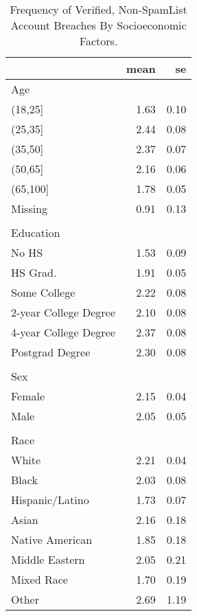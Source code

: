\begin{table}[!htb]
\centering
\caption{Frequency of Verified, Non-SpamList Account Breaches By Socioeconomic Factors.} 
\label{table:socdem_verified_dat}
\begingroup\small
\begin{tabular}{lrr}
  \hline
 & mean & se \\ 
  \hline
Age &  &  \\ 
  (18,25] & 1.63 & 0.10 \\ 
  (25,35] & 2.44 & 0.08 \\ 
  (35,50] & 2.37 & 0.07 \\ 
  (50,65] & 2.16 & 0.06 \\ 
  (65,100] & 1.78 & 0.05 \\ 
  Missing & 0.91 & 0.13 \\ 
   &  &  \\ 
  Education &  &  \\ 
  No HS & 1.53 & 0.09 \\ 
  HS Grad. & 1.91 & 0.05 \\ 
  Some College & 2.22 & 0.08 \\ 
  2-year College Degree & 2.10 & 0.08 \\ 
  4-year College Degree & 2.37 & 0.08 \\ 
  Postgrad Degree & 2.30 & 0.08 \\ 
   &  &  \\ 
  Sex &  &  \\ 
  Female & 2.15 & 0.04 \\ 
  Male & 2.05 & 0.05 \\ 
   &  &  \\ 
  Race &  &  \\ 
  White & 2.21 & 0.04 \\ 
  Black & 2.03 & 0.08 \\ 
  Hispanic/Latino & 1.73 & 0.07 \\ 
  Asian & 2.16 & 0.18 \\ 
  Native American & 1.85 & 0.18 \\ 
  Middle Eastern & 2.05 & 0.21 \\ 
  Mixed Race & 1.70 & 0.19 \\ 
  Other & 2.69 & 1.19 \\ 
   \hline
\end{tabular}
\endgroup
\end{table}

